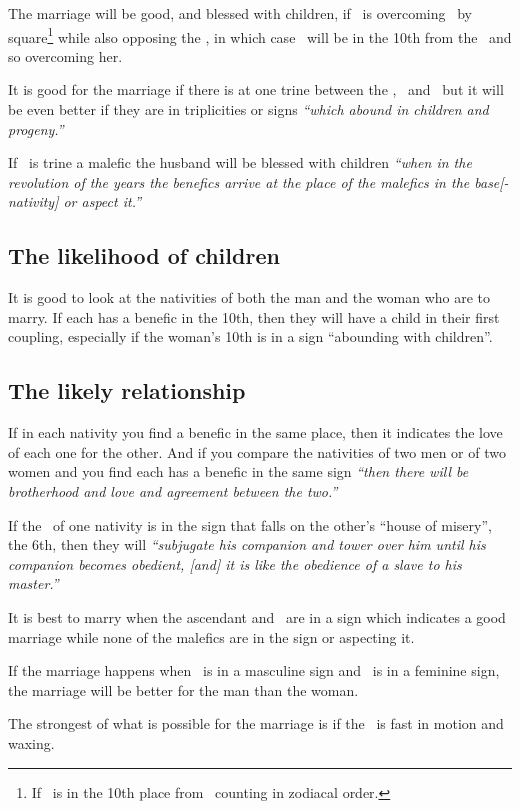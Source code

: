 The marriage will be good, and blessed with children, if \Jupiter\, is overcoming \Venus\, by square\footnote{If \Jupiter\, is in the 10th place from \Venus\, counting in zodiacal order.} while also opposing the \Moon, in which case \Venus\, will be in the 10th from the \Moon\, and so overcoming her.

It is good for the marriage if there is at one trine between the \Moon, \Venus\, and \Jupiter\, but it will be even better if they are in triplicities or signs \textsl{``which abound in children and progeny.''}

If \Venus\, is trine a malefic the husband will be blessed with children \textsl{``when in the revolution of the years the benefics arrive at the place of the malefics in the base[-nativity] or aspect it.''}

\subsection{The likelihood of children}
It is good to look at the nativities of both the man and the woman who are to marry. If each has a benefic in the 10th, then they will have a child in their first coupling, especially if the woman's 10th is in a sign ``abounding with children''.

\subsection{The likely relationship}
If in each nativity you find a benefic in the same place, then it indicates the love of each one for the other. And if you compare the nativities of two men or of two women and you find each has a benefic in the same sign \textsl{``then there will be brotherhood and love and agreement between the two.''}

If the \Moon\, of one nativity is in the sign that falls on the other's ``house of misery'', the 6th, then they will \textsl{``subjugate his companion and tower over him until his companion becomes obedient, [and] it is like the obedience of a slave to his master.''}

It is best to marry when the ascendant and \Moon\, are in a sign which indicates a good marriage while none of the malefics are in the sign or aspecting it.

If the marriage happens when \Venus\, is in a masculine sign and \Jupiter\, is in a feminine sign, the marriage will be better for the man than the woman.

The strongest of what is possible for the marriage is if the \Moon\, is fast in motion and waxing.

